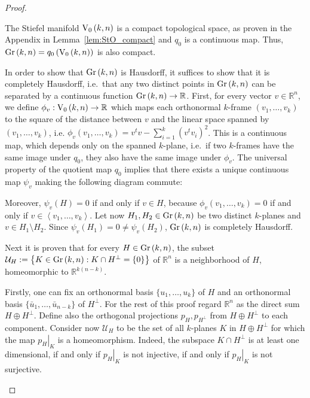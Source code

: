 \begin{proof} \begin{b_item}
\item The Stiefel manifold $\StO{k}{n}$ is a compact topological space, as proven in the Appendix in Lemma~\ref{lem:StO_compact} and $q_0$ is a continuous map. Thus, $\Gr{k}{n}=q_0\left(\StO{k}{n}\right)$ is also compact.
\item In order to show that $\Gr{k}{n}$ is Hausdorff, it suffices to show that it is completely Hausdorff, i.e.\ that any two distinct points in $\Gr{k}{n}$ can be separated by a continuous function $\Gr{k}{n}\to\mathbb{R}$. First, for every vector $v\in\mathbb{R}^n$, we define $\phi_v:\StO{k}{n}\to\mathbb{R}$ which maps each orthonormal $k$-frame $(v_1,\ldots,v_k)$ to the square of the distance between $v$ and the linear space spanned by $(v_1,\ldots,v_k)$, i.e.
$\phi_v(v_1,\ldots,v_k)=v^tv-\sum_{i=1}^k{\left(v^tv_i\right)}^2$.
This is a continuous map, which depends only on the spanned $k$-plane, i.e.\ if two $k$-frames have the same image under $q_0$, they also have the same image under $\phi_v$. The universal property of the quotient map $q_0$ implies that there exists a unique continuous map $\psi_v$ making the following diagram commute:

\begin{center}
\end{center}

Moreover, $\psi_v(H)=0$ if and only if $v\in H$, because $\phi_v(v_1,\ldots,v_k)=0$ if and only if $v\in \left<v_1,\ldots,v_k\right>$.
Let now $H_1,H_2\in\Gr{k}{n}$ be two distinct $k$-planes and $v\in H_1\setminus H_2$.
Since $\psi_v(H_1)=0\neq\psi_v(H_2)$, $\Gr{k}{n}$ is completely Hausdorff.

\item Next it is proven that for every $H\in\Gr{k}{n}$, the subset $\mathcal{U}_H:=\left\{K\in\Gr{k}{n}:K\cap H^{\perp}=\{0\}\right\}$ of $\mathbb{R}^n$ is a neighborhood of $H$, homeomorphic to $\mathbb{R}^{k(n-k)}$.

Firstly, one can fix an orthonormal basis $\{u_1,\ldots,u_k\}$ of $H$ and an orthonormal basis $\{\bar{u}_1,\ldots,\bar{u}_{n-k}\}$ of $H^{\perp}$. For the rest of this proof regard $\mathbb{R}^n$ as the direct sum $H\oplus H^{\perp}$. Define also the orthogonal projections $p_H,p_{H^{\perp}}$ from $H\oplus H^{\perp}$ to each component.
Consider now $\mathcal{U}_H$ to be the set of all $k$-planes $K$ in $H\oplus H^{\perp}$ for which the map $\left.p_H\right|_{K}$ is a homeomorphism. Indeed, the subspace $K\cap H^{\perp}$ is at least one dimensional, if and only if $\left.p_H\right|_K$ is not injective, if and only if $\left.p_H\right|_K$ is not surjective.


\end{b_item}
\end{proof}
